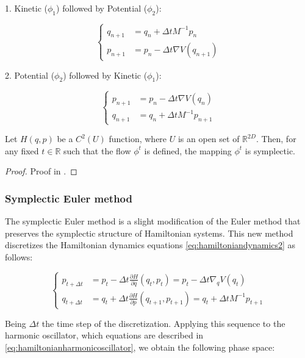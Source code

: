 \documentclass{article}
\begin{document}
1. Kinetic (\(\phi_1\)) followed by Potential (\(\phi_2\)):

\[
	\begin{cases}
		q_{n+1} &= q_n + \Delta t M^{-1} p_n \\
		p_{n+1} &= p_n - \Delta t \nabla V(q_{n+1})
	\end{cases}
\]

2. Potential (\(\phi_2\)) followed by Kinetic (\(\phi_1\)):

\[
	\begin{cases}
		p_{n+1} &= p_n - \Delta t \nabla V(q_n) \\
		q_{n+1} &= q_n + \Delta t M^{-1} p_{n+1}
	\end{cases}
\]

\begin{theorem}
	Let \(H(q,p)\) be a \(C^2(U)\) function, where \(U\) is an open set of \(\mathbb{R}^{2D}\). Then, for any fixed \(t \in \mathbb{R}\) such that the flow \(\phi^t\) is defined, the mapping \(\phi^t\) is symplectic.
\end{theorem}

\begin{proof}
	Proof in \cite[Chapter 2.1.2]{stoltz2023introduction}.
\end{proof}



\subsubsection{Symplectic Euler method}
\label{sec:symplectic_euler_method}

The symplectic Euler method is a slight modification of the Euler method that preserves the symplectic structure of Hamiltonian systems. This new method discretizes the Hamiltonian dynamics equations \eqref{eq:hamiltoniandynamics2} as follows:

\begin{equation}
	\begin{cases}
		p_{t+ \Delta t} &= p_t - \Delta t \frac{\partial H}{\partial q}(q_t, p_t) = p_t - \Delta t \nabla_q V(q_t) \\
		q_{t+ \Delta t} &= q_t + \Delta t \frac{\partial H}{\partial p}(q_{t+1}, p_{t+1}) = q_t + \Delta t M^{-1} p_{t+1}
	\end{cases}
	\label{eq:symplecticeuler}
\end{equation}

Being \(\Delta t\) the time step of the discretization. Applying this sequence to the harmonic oscillator, which equations are described in \eqref{eq:hamiltonianharmonicoscillator}, we obtain the following phase space:
\end{document}
